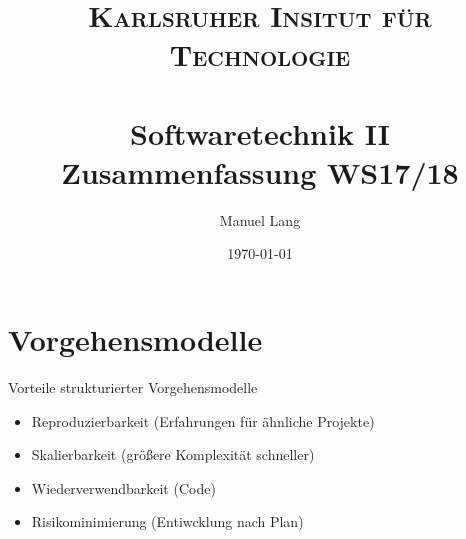 \documentclass[paper=a4, fontsize=11pt]{scrartcl} %
\title{
\normalfont \normalsize
\textsc{Karlsruher Insitut für Technologie} \\ [25pt] %
\horrule{0.5pt} \\[0.4cm] %
\huge Softwaretechnik II\\ Zusammenfassung WS17/18 %
\horrule{2pt} \\[0.5cm] %
}
\author{Manuel Lang} %
\date{\normalsize\today} %
\numberwithin{equation}{section} %
\numberwithin{figure}{section} %
\numberwithin{table}{section} %
\begin{document}
\maketitle %
\tableofcontents
\newpage

\section{Vorgehensmodelle}

Vorteile strukturierter Vorgehensmodelle
\begin{itemize}
  \item Reproduzierbarkeit (Erfahrungen für ähnliche Projekte)
  \item Skalierbarkeit (größere Komplexität schneller)
  \item Wiederverwendbarkeit (Code)
  \item Risikominimierung (Entiwcklung nach Plan)
\end{itemize}
\end{document}
